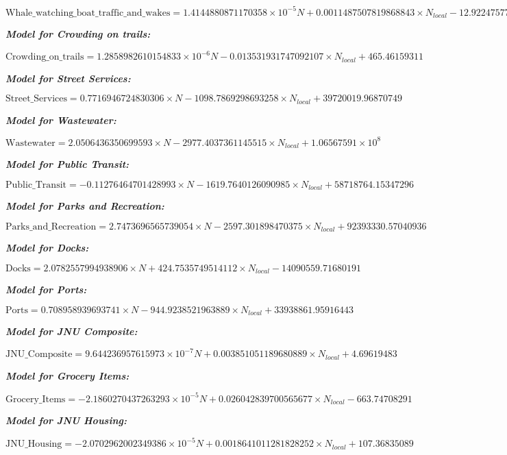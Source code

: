 \begin{appendices}
    $\text{Whale\_watching\_boat\_traffic\_and\_wakes} = 1.4144880871170358 \times 10^{-5} N + 0.0011487507819868843 \times N_{local} - 12.92247577$
    
    \textbf{\textit{Model for Crowding on trails: }}
    
    $\text{Crowding\_on\_trails} = 1.2858982610154833 \times 10^{-6} N - 0.013531931747092107 \times N_{local} + 465.46159311$
    
    \textbf{\textit{Model for Street Services: }}
    
    $\text{Street\_Services} = 0.7716946724830306 \times N - 1098.7869298693258 \times N_{local} + 39720019.96870749$
    
    \textbf{\textit{Model for Wastewater: }}
    
    $\text{Wastewater} = 2.0506436350699593 \times N - 2977.4037361145515 \times N_{local} + 1.06567591 \times 10^8$
    
    \textbf{\textit{Model for Public Transit: }}
    
    $\text{Public\_Transit} = -0.11276464701428993 \times N - 1619.7640126090985 \times N_{local} + 58718764.15347296$
    
    \textbf{\textit{Model for Parks and Recreation: }}
    
    $\text{Parks\_and\_Recreation} = 2.7473696565739054 \times N - 2597.301898470375 \times N_{local} + 92393330.57040936$
    
    \textbf{\textit{Model for Docks: }}
    
    $\text{Docks} = 2.0782557994938906 \times N + 424.7535749514112 \times N_{local} - 14090559.71680191$
    
    \textbf{\textit{Model for Ports: }}
    
    $\text{Ports} = 0.708958939693741 \times N - 944.9238521963889 \times N_{local} + 33938861.95916443$
    
    \textbf{\textit{Model for JNU Composite: }}
    
    $\text{JNU\_Composite} = 9.644236957615973 \times 10^{-7} N + 0.003851051189680889 \times N_{local} + 4.69619483$
    
    \textbf{\textit{Model for Grocery Items: }}
    
    $\text{Grocery\_Items} = -2.1860270437263293 \times 10^{-5} N + 0.026042839700565677 \times N_{local} - 663.74708291$
    
    \textbf{\textit{Model for JNU Housing: }}
    
    $\text{JNU\_Housing} = -2.0702962002349386 \times 10^{-5} N + 0.0018641011281828252 \times N_{local} + 107.36835089$
    

\end{appendices}
